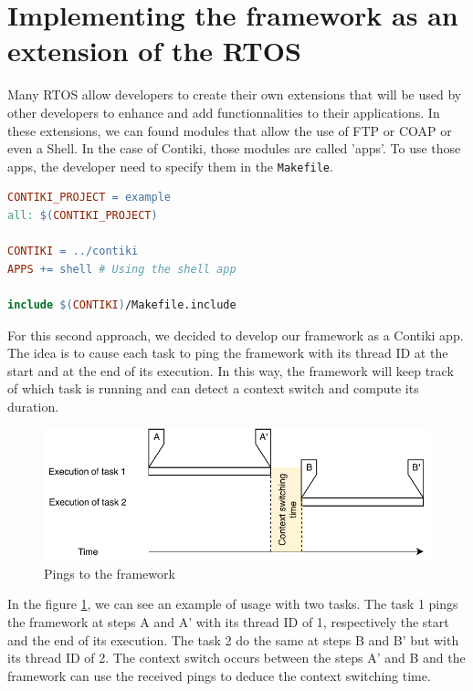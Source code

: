 \section{Implementing the framework as an extension of the RTOS \label{sec:extension}}

Many RTOS allow developers to create their own extensions that will be used by other developers to enhance and add functionnalities to their applications.
In these extensions, we can found modules that allow the use of FTP or COAP or even a Shell.
In the case of Contiki, those modules are called 'apps'.
To use those apps, the developer need to specify them in the \texttt{Makefile}.

\begin{lstlisting}[style=CStyle, language=make, caption=Example of Makefile using the app \texttt{shell} with Contiki]
CONTIKI_PROJECT = example
all: $(CONTIKI_PROJECT)

CONTIKI = ../contiki
APPS += shell # Using the shell app

include $(CONTIKI)/Makefile.include
\end{lstlisting}

For this second approach, we decided to develop our framework as a Contiki app.
The idea is to cause each task to ping the framework with its thread ID at the start and at the end of its execution.
In this way, the framework will keep track of which task is running and can detect a context switch and compute its duration.

\begin{figure}[!ht]
  \centering
  \includegraphics[scale=1]{assets/internal-framework-ping.pdf}
  \caption{\label{fig:internal-framework-ping}Pings to the framework}
\end{figure}

In the figure \ref{fig:internal-framework-ping}, we can see an example of usage with two tasks.
The task 1 pings the framework at steps A and A' with its thread ID of 1, respectively the start and the end of its execution.
The task 2 do the same at steps B and B' but with its thread ID of 2.
The context switch occurs between the steps A' and B and the framework can use the received pings to deduce the context switching time.

